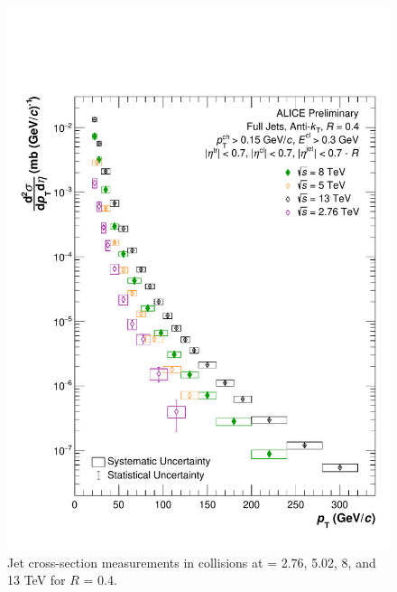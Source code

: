 \begin{figure}[h!]
    \centering
    \includegraphics[width=15cm]{figures/EnergyComparisons/SpectrumComparison_R04.pdf}
    \caption{Jet cross-section measurements in \pp collisions at \s = 2.76, 5.02, 8, and 13 TeV for $R$ = 0.4.}
    \label{fig:appSpecCompareR04}
\end{figure}

